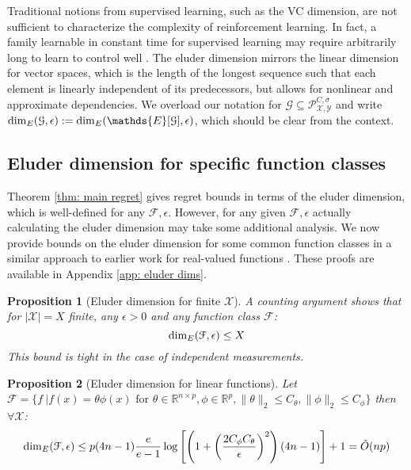 \documentclass{article}
\newtheorem{prop}{Proposition}
\newcommand{\Exp}{\mathds{E}}
\newcommand{\Real}{\mathds{R}}
\newcommand{\Xc}{\mathcal{X}}
\newcommand{\Yc}{\mathcal{Y}}
\newcommand{\Pc}{\mathcal{P}}
\newcommand{\Fc}{\mathcal{F}}
\newcommand{\Gc}{\mathcal{G}}
\begin{document}
Traditional notions from supervised learning, such as the VC dimension, are not sufficient to characterize the complexity of reinforcement learning.
In fact, a family learnable in constant time for supervised learning may require arbitrarily long to learn to control well \cite{russo2013eluder}.
The eluder dimension mirrors the linear dimension for vector spaces, which is the length of the longest sequence such that each element is linearly independent of its predecessors, but allows for nonlinear and approximate dependencies.
We overload our notation for $\Gc \subseteq \Pc^{C,\sigma}_{\Xc,\Yc}$ and write ${\rm dim}_E(\Gc,\epsilon) := {\rm dim}_E(\Exp[\Gc],\epsilon)$, which should be clear from the context.



\subsection{Eluder dimension for specific function classes}
Theorem \ref{thm: main regret} gives regret bounds in terms of the eluder dimension, which is well-defined for any $\Fc, \epsilon$.
However, for any given $\Fc,\epsilon$ actually calculating the eluder dimension may take some additional analysis.
We now provide bounds on the eluder dimension for some common function classes in a similar approach to earlier work for real-valued functions \cite{russo2013}.
These proofs are available in Appendix \ref{app: eluder dims}.

\begin{prop}[Eluder dimension for finite $\mathcal{X}$]
\hspace{0.00000000000001mm} \newline
A counting argument shows that for $| \mathcal{X} | = X$ finite, any $\epsilon>0$ and any function class $\Fc$:
$$ {\rm dim}_E( \mathcal{F}, \epsilon) \le X $$
This bound is tight in the case of independent measurements.
\end{prop}

\begin{prop}[Eluder dimension for linear functions]
\label{prop: eluder lin}
\hspace{0.00000000000001mm} \newline
Let $\mathcal{F} = \{ f \ | f(x) = \theta \phi(x)  \text{ for } \theta \in \Real^{n \times p}, \phi \in \Real^p ,
\|\theta \|_2 \le C_\theta , \|\phi\|_2 \le C_\phi \}$
then $\forall \mathcal{X}$:
$$ {\rm dim}_E(\Fc, \epsilon) \le p(4n-1)\frac{e}{e-1} \log\left[ \left(1+\left( \frac{2C_\phi C_\theta}{\epsilon}\right)^2 \right)\left(4n-1\right) \right] + 1 = \tilde{O}(np) $$
\end{prop}
\end{document}
